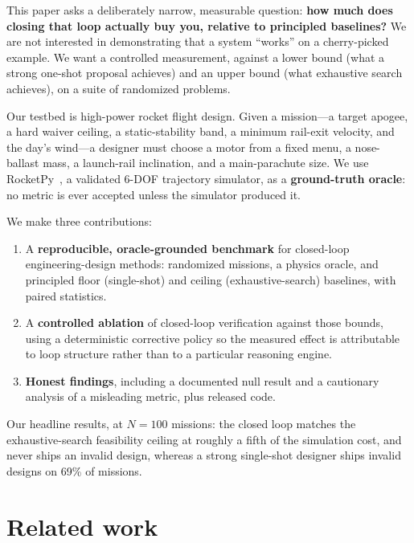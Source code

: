 \documentclass[11pt]{article}
\begin{document}
This paper asks a deliberately narrow, measurable question: \textbf{how much does
closing that loop actually buy you, relative to principled baselines?} We are not
interested in demonstrating that a system ``works'' on a cherry-picked example.
We want a controlled measurement, against a lower bound (what a strong one-shot
proposal achieves) and an upper bound (what exhaustive search achieves), on a
suite of randomized problems.

Our testbed is high-power rocket flight design. Given a mission---a target
apogee, a hard waiver ceiling, a static-stability band, a minimum rail-exit
velocity, and the day's wind---a designer must choose a motor from a fixed menu,
a nose-ballast mass, a launch-rail inclination, and a main-parachute size. We use
RocketPy~\cite{rocketpy}, a validated 6-DOF trajectory simulator, as a
\textbf{ground-truth oracle}: no metric is ever accepted unless the simulator
produced it.

We make three contributions:
\begin{enumerate}
  \item A \textbf{reproducible, oracle-grounded benchmark} for closed-loop
  engineering-design methods: randomized missions, a physics oracle, and
  principled floor (single-shot) and ceiling (exhaustive-search) baselines, with
  paired statistics.
  \item A \textbf{controlled ablation} of closed-loop verification against those
  bounds, using a deterministic corrective policy so the measured effect is
  attributable to loop structure rather than to a particular reasoning engine.
  \item \textbf{Honest findings}, including a documented null result and a
  cautionary analysis of a misleading metric, plus released code.
\end{enumerate}

Our headline results, at $N = 100$ missions: the closed loop matches the
exhaustive-search feasibility ceiling at roughly a fifth of the simulation cost,
and never ships an invalid design, whereas a strong single-shot designer ships
invalid designs on 69\% of missions.

\section{Related work}
\end{document}
